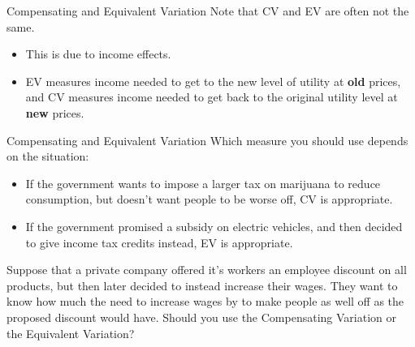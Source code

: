 \documentclass[12pt,t]{beamer}
\begin{document}

\begin{frame}{Compensating and Equivalent Variation}
  Note that CV and EV are often not the same.
  
  \bigskip
  \begin{itemize}
    \item This is due to income effects.

    \item EV measures income needed to get to the new level of utility at \textbf{old} prices, and CV measures income needed to get back to the original utility level at \textbf{new} prices.
  \end{itemize}
\end{frame}

\begin{frame}{Compensating and Equivalent Variation}
  Which measure you should use depends on the situation:

  \bigskip
  \begin{itemize}
    \item If the government wants to impose a larger tax on marijuana to reduce consumption, but doesn't want people to be worse off, CV is appropriate.

    \item If the government promised a subsidy on electric vehicles, and then decided to give income tax credits instead, EV is appropriate.
  \end{itemize}
\end{frame}

\begin{frame}
  
  \bigskip
  Suppose that a private company offered it's workers an employee discount on all products, but then later decided to instead increase their wages. They want to know how much the need to increase wages by to make people as well off as the proposed discount would have. Should you use the Compensating Variation or the Equivalent Variation?
\end{frame}
\end{document}
